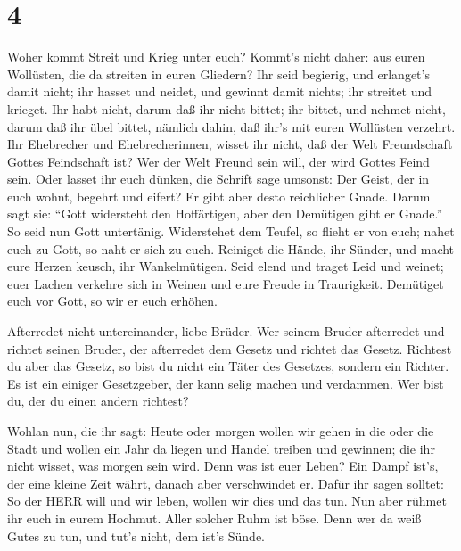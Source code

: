 \hypertarget{section-3}{%
\section{4}\label{section-3}}

 Woher kommt Streit und Krieg unter euch? Kommt's nicht
daher: aus euren Wollüsten, die da streiten in euren Gliedern?
 Ihr seid begierig, und erlanget's damit nicht; ihr hasset
und neidet, und gewinnt damit nichts; ihr streitet und krieget. Ihr habt
nicht, darum daß ihr nicht bittet;  ihr bittet, und nehmet
nicht, darum daß ihr übel bittet, nämlich dahin, daß ihr's mit euren
Wollüsten verzehrt.  Ihr Ehebrecher und Ehebrecherinnen,
wisset ihr nicht, daß der Welt Freundschaft Gottes Feindschaft ist? Wer
der Welt Freund sein will, der wird Gottes Feind sein.  Oder
lasset ihr euch dünken, die Schrift sage umsonst: Der Geist, der in euch
wohnt, begehrt und eifert?  Er gibt aber desto reichlicher
Gnade. Darum sagt sie: ``Gott widersteht den Hoffärtigen, aber den
Demütigen gibt er Gnade.''  So seid nun Gott untertänig.
Widerstehet dem Teufel, so flieht er von euch;  nahet euch
zu Gott, so naht er sich zu euch. Reiniget die Hände, ihr Sünder, und
macht eure Herzen keusch, ihr Wankelmütigen.  Seid elend und
traget Leid und weinet; euer Lachen verkehre sich in Weinen und eure
Freude in Traurigkeit.  Demütiget euch vor Gott, so wir er
euch erhöhen.

 Afterredet nicht untereinander, liebe Brüder. Wer seinem
Bruder afterredet und richtet seinen Bruder, der afterredet dem Gesetz
und richtet das Gesetz. Richtest du aber das Gesetz, so bist du nicht
ein Täter des Gesetzes, sondern ein Richter.  Es ist ein
einiger Gesetzgeber, der kann selig machen und verdammen. Wer bist du,
der du einen andern richtest?

 Wohlan nun, die ihr sagt: Heute oder morgen wollen wir
gehen in die oder die Stadt und wollen ein Jahr da liegen und Handel
treiben und gewinnen;  die ihr nicht wisset, was morgen
sein wird. Denn was ist euer Leben? Ein Dampf ist's, der eine kleine
Zeit währt, danach aber verschwindet er.  Dafür ihr sagen
solltet: So der HERR will und wir leben, wollen wir dies und das tun.
 Nun aber rühmet ihr euch in eurem Hochmut. Aller solcher
Ruhm ist böse.  Denn wer da weiß Gutes zu tun, und tut's
nicht, dem ist's Sünde.

